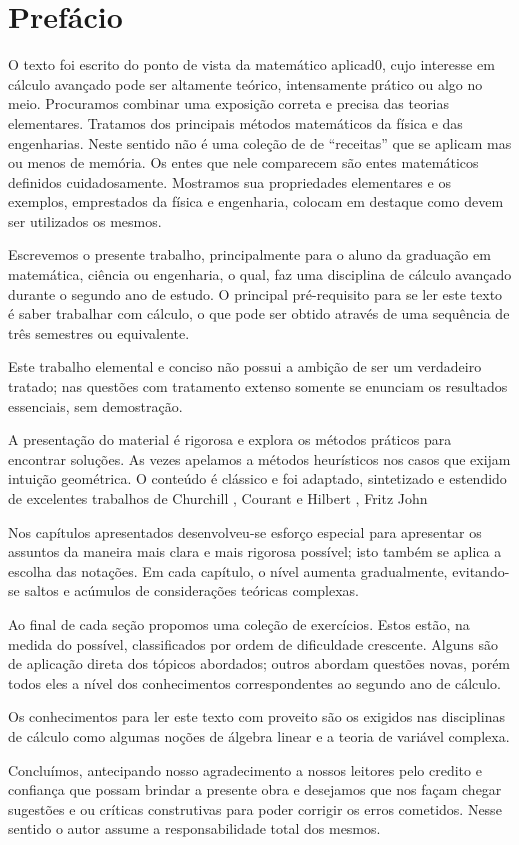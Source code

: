 \newpage

\chapter*{Prefácio}
%
O texto foi escrito do ponto de vista da matemático aplicad0, cujo interesse em cálculo avançado pode ser altamente teórico, intensamente prático ou algo no meio. Procuramos combinar uma exposição correta e precisa das teorias elementares. Tratamos dos principais métodos matemáticos da física e das engenharias. Neste sentido não é uma coleção de de ``receitas'' que se aplicam mas ou menos de memória. Os entes que nele comparecem são entes matemáticos definidos cuidadosamente. Mostramos sua propriedades elementares e os exemplos, emprestados da física e engenharia, colocam em destaque como devem ser utilizados os mesmos.

Escrevemos o presente trabalho, principalmente para o aluno da graduação em matemática, ciência ou engenharia, o qual, faz uma disciplina de cálculo avançado durante o segundo ano de estudo. O principal pré-requisito para se ler este texto é saber trabalhar com cálculo, o que pode ser obtido através de uma sequência de três semestres ou equivalente.

Este trabalho elemental e conciso não possui a ambição de ser um verdadeiro tratado; nas questões com tratamento extenso somente se enunciam os resultados essenciais, sem demostração.

A presentação do material é rigorosa e explora os métodos práticos para encontrar soluções. As vezes apelamos a métodos heurísticos nos casos que exijam intuição geométrica. O conteúdo é clássico e foi adaptado, sintetizado e estendido de excelentes trabalhos de Churchill \cite{chur}, Courant e Hilbert \cite{cou_hil}, Fritz John \cite{joh}

 Nos capítulos apresentados desenvolveu-se esforço especial para apresentar os assuntos da maneira mais clara e mais rigorosa possível; isto também se aplica a escolha das notações. Em cada capítulo, o nível aumenta gradualmente, evitando-se saltos e acúmulos de considerações  teóricas complexas.

Ao final de cada seção propomos uma coleção de exercícios. Estos estão, na medida do possível, classificados por ordem de dificuldade crescente. Alguns são de aplicação direta dos tópicos abordados; outros abordam questões novas, porém todos eles a nível dos conhecimentos correspondentes ao segundo ano de cálculo.


Os conhecimentos para ler este texto com proveito são os exigidos nas disciplinas de cálculo como algumas noções de álgebra linear e a teoria de variável complexa.

Concluímos, antecipando nosso agradecimento a nossos leitores pelo credito e confiança que possam brindar a presente obra e desejamos que nos façam chegar sugestões e ou críticas construtivas para poder corrigir os erros cometidos. Nesse sentido o autor assume a responsabilidade total dos mesmos.
